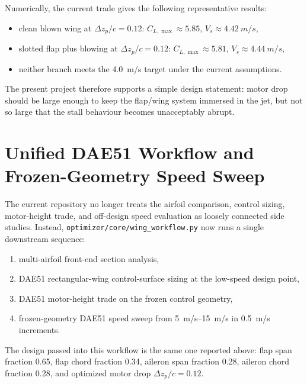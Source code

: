 \documentclass[conf]{new-aiaa}
\begin{document}
Numerically, the current trade gives the following representative results:
\begin{itemize}
\item clean blown wing at \(\Delta z_p/c = 0.12\): \(C_{L,\max}\approx 5.85\), \(V_s\approx \SI{4.42}{m/s}\),
\item slotted flap plus blowing at \(\Delta z_p/c = 0.12\): \(C_{L,\max}\approx 5.81\), \(V_s\approx \SI{4.44}{m/s}\),
\item neither branch meets the \SI{4.0}{m/s} target under the current assumptions.
\end{itemize}

The present project therefore supports a simple design statement: motor drop should be large enough to keep the flap/wing system immersed in the jet, but not so large that the stall behaviour becomes unacceptably abrupt.

\section{Unified DAE51 Workflow and Frozen-Geometry Speed Sweep}

The current repository no longer treats the airfoil comparison, control sizing, motor-height trade, and off-design speed evaluation as loosely connected side studies. Instead, \texttt{optimizer/core/wing\_workflow.py} now runs a single downstream sequence:
\begin{enumerate}
\item multi-airfoil front-end section analysis,
\item DAE51 rectangular-wing control-surface sizing at the low-speed design point,
\item DAE51 motor-height trade on the frozen control geometry,
\item frozen-geometry DAE51 speed sweep from \SIrange{5}{15}{m/s} in \SI{0.5}{m/s} increments.
\end{enumerate}
The design passed into this workflow is the same one reported above: flap span fraction 0.65, flap chord fraction 0.34, aileron span fraction 0.28, aileron chord fraction 0.28, and optimized motor drop \(\Delta z_p/c = 0.12\).
\end{document}
